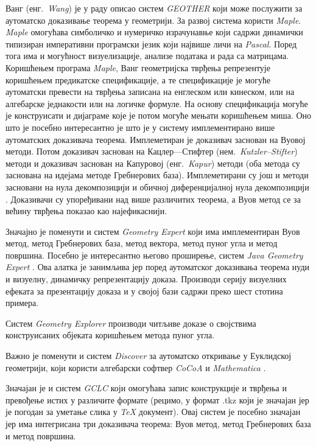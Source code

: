 Ванг (енг.~\emph{Wang}) је у раду \cite{wang2002geother} описао систем
\emph{GEOTHER} који може послужити за аутоматско доказивање теорема у
геометрији. За развој система користи \emph{Maple}. \emph{Maple}
омогућава симболичко и нумеричко израчунавње који садржи динамички
типизиран императивни програмски језик који највише личи на
\emph{Pascal}. Поред тога има и могућност визуелизације, анализе
података и рада са матрицама. Коришћењем програма \emph{Maple}, Ванг
геометријска тврђења репрезентује коришћењем предикатске
спецификације, а те спецификације је могуће аутоматски превести на
тврђења записана на енглеском или кинеском, или на алгебарске
једнакости или на логичке формуле. На основу спецификација могуће је
конструисати и дијаграме које је потом могуће мењати коришћењем
миша. Оно што је посебно интересантно је што је у систему
имплементирано више аутоматских доказивача теорема. Имплеметиран је
доказивач заснован на Вуовој методи. Потом доказивач заснован на
Кацлер---Стифтер (нем.~\emph{Kutzler--Stifter}) методи и доказивач
заснован на Капуровој (енг.~\emph{Kapur}) методи (оба метода су
заснована на идејама методе Гребнерових база). Имплеметирани су још и
методи засновани на нула декомпозицији и обичној диференцијалној нула
декомпозицији \cite{wang1995elimination}. Доказивачи су упоређивани
над више различитих теорема, а Вуов метод се за већину тврђења показао
као најефикаснији.

Значајно је поменути и систем \emph{Geometry Expert}
\cite{chou1996introduction} који има имплементиран Вуов метод, метод
Гребнерових база, метод вектора, метод пуног угла и метод
површина. Посебно је интересантно његово проширење, систем \emph{Java
  Geometry Expert} \cite{ye2008introduction}. Ова алатка је занимљива
јер поред аутоматског доказивања теорема нуди и визуелну, динамичку
репрезентацију доказа. Производи серију визуелних ефеката за
презентацију доказа и у својој бази садржи преко шест стотина примера.

Систем \emph{Geometry Explorer} \cite{wilson2005combining} производи
читљиве доказе о својствима конструисаних објеката коришћењем метода
пуног угла.

Важно је поменути и систем \emph{Discover} \cite{botana2002dynamic} за
аутоматско откривање у Еуклидској геометрији, који користи алгебарски
софтвер \emph{CoCoA} \cite{abbottcocoa} и \emph{Mathematica}
\cite{wolfram2008mathematica}.

Значајан је и систем \emph{GCLC} \cite{janivcic2010geometry} који
омогућава запис конструкције и тврђења и превођење истих у различите
формате (рецимо, у формат .tkz који је значајан јер је погодан за
уметање слика у \emph{TeX} документ). Овај систем је посебно значајан
јер има интегрисана три доказивача теорема: Вуов метод, метод
Гребнерових база и метод површина.

